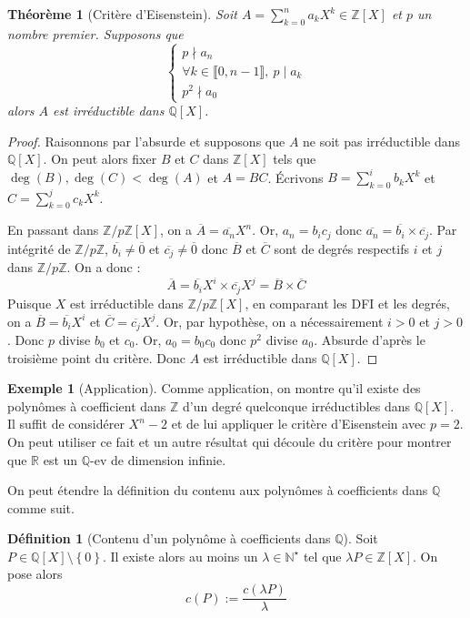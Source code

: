 \documentclass[french]{book}
\newcommand{\N}{\mathbb{N}}
\newcommand{\Z}{\mathbb{Z}}
\newcommand{\Q}{\mathbb{Q}}
\newcommand{\R}{\mathbb{R}}
\newcommand{\st}{^\star}
\theoremstyle{plain}
\newtheorem{thm}{Théorème}[chapter]
\theoremstyle{definition}
\newtheorem{dfn}{Définition}[chapter]
\newtheorem{exa}{Exemple}[chapter]
\theoremstyle{remark}
\begin{document}
\begin{thm}[Critère d'Eisenstein]
	Soit $A=\sum_{k=0}^{n}a_kX^k\in\Z[X]$ et $p$ un nombre premier. Supposons que $$\begin{cases}
		p \nmid a_n \\
		\forall k\in\llbracket0,n-1\rrbracket,\ p\mid a_k \\
		p^2\nmid a_0
	\end{cases}$$ alors $A$ est irréductible dans $\Q[X]$.
\end{thm}
\begin{proof}
	Raisonnons par l'absurde et supposons que $A$ ne soit pas irréductible dans $\Q[X]$. On peut alors fixer $B$ et $C$ dans $\Z[X]$ tels que $\deg(B),\deg(C)<\deg(A)$ et $A=BC$. Écrivons $B=\displaystyle\sum_{k=0}^{i}b_kX^k$ et $C=\displaystyle\sum_{k=0}^{j}c_kX^k$. \par En passant dans $\Z/p\Z[X]$, on a $\overline{A}=\overline{a_n}X^n$. Or, $a_n=b_ic_j$ donc $\overline{a_n}=\overline{b_i}\times\overline{c_j}$. Par intégrité de $\Z/p\Z$, $\overline{b_i}\ne\overline{0}$ et $\overline{c_j}\ne\overline{0}$ donc $\overline{B}$ et $\overline{C}$ sont de degrés respectifs $i$ et $j$ dans $\Z/p\Z$. On a donc : $$\overline{A}=\overline{b_i}X^i\times\overline{c_j}X^j=\overline{B}\times\overline{C}$$ Puisque $X$ est irréductible dans $\Z/p\Z[X]$, en comparant les DFI et les degrés, on a $\overline{B}=\overline{b_i}X^i$ et $\overline{C}=\overline{c_j}X^j$. Or, par hypothèse, on a nécessairement $i>0$ et $j>0$. Donc $p$ divise $b_0$ et $c_0$. Or, $a_0=b_0c_0$ donc $p^2$ divise $a_0$. Absurde d'après le troisième point du critère. Donc $A$ est irréductible dans $\Q[X]$.
\end{proof}
\begin{exa}[Application]
	Comme application, on montre qu'il existe des polynômes à coefficient dans $\Z$ d'un degré quelconque irréductibles dans $\Q[X]$. Il suffit de considérer $X^n-2$ et de lui appliquer le critère d'Eisenstein avec $p=2$. On peut utiliser ce fait et un autre résultat qui découle du critère pour montrer que $\R$ est un $\Q$-ev de dimension infinie.
\end{exa}
On peut étendre la définition du contenu aux polynômes à coefficients dans $\Q$ comme suit.
\begin{dfn}[Contenu d'un polynôme à coefficients dans $\Q$]
	Soit $P\in\Q[X]\setminus\left\{0\right\}$. Il existe alors au moins un $\lambda\in\N\st$ tel que $\lambda P\in\Z[X]$. On pose alors $$c(P):=\frac{c(\lambda P)}{\lambda}$$
\end{dfn}
\end{document}
